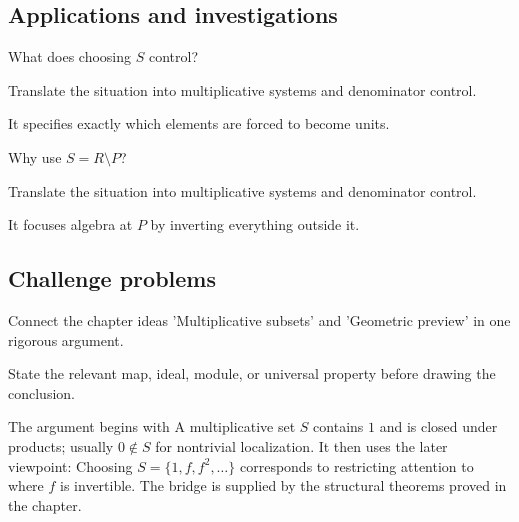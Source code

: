 \subsection*{Applications and investigations}

\begin{exercise}\label{exr:v05-expand-13}
What does choosing $S$ control?
\end{exercise}
\begin{hint}
Translate the situation into multiplicative systems and denominator control.
\end{hint}
\begin{solution}
It specifies exactly which elements are forced to become units.
\end{solution}

\begin{exercise}\label{exr:v05-expand-14}
Why use $S=R\setminus P$?
\end{exercise}
\begin{hint}
Translate the situation into multiplicative systems and denominator control.
\end{hint}
\begin{solution}
It focuses algebra at $P$ by inverting everything outside it.
\end{solution}

\subsection*{Challenge problems}

\begin{exercise}\label{exr:v05-expand-15}
Connect the chapter ideas 'Multiplicative subsets' and 'Geometric preview' in one rigorous argument.
\end{exercise}
\begin{hint}
State the relevant map, ideal, module, or universal property before drawing the conclusion.
\end{hint}
\begin{solution}
The argument begins with A multiplicative set $S$ contains $1$ and is closed under products; usually $0\notin S$ for nontrivial localization. It then uses the later viewpoint: Choosing $S=\{1,f,f^2,\dots\}$ corresponds to restricting attention to where $f$ is invertible. The bridge is supplied by the structural theorems proved in the chapter.
\end{solution}

